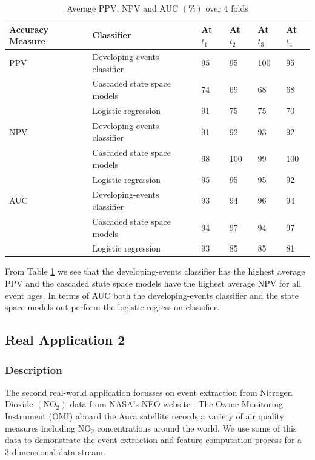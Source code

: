 \documentclass[11pt]{article}
\begin{document}
	\begin{table}[H]
		\centering
		\caption{Average PPV, NPV and AUC $(\%)$ over $4$ folds }
		\footnotesize
		\begin{tabular}{p{1.5cm}p{6cm}p{1cm}p{1cm}p{1cm}p{1cm}}
			\toprule
			Accuracy Measure & Classifier & At $t_1$ & At $t_2$  & At $t_3$ & At $t_4$    \\
			\midrule
			PPV & 	Developing-events classifier    & 95 	& 95  & 100 & 95        \\
			& Cascaded state space models    &74 	& 69  & 68 & 68        \\
			& Logistic regression & 91 & 75 & 75 & 70  	\\
			\hline	
			NPV & 	Developing-events classifier    & 91 	& 92  & 93 & 92        \\
			& Cascaded state space models    & 98 	& 100  & 99 & 100        \\
			& Logistic regression & 95 & 95 & 95 & 92  	\\
			\hline	  	
			AUC & 	Developing-events classifier    & 93 	& 94  & 96 & 94        \\
			& Cascaded state space models    & 94 	& 97  & 94 & 97        \\
			& Logistic regression & 93 & 85 & 85 & 81  	\\
			\bottomrule
		\end{tabular}
		\label{tab:AverageAccuracyReal}
	\end{table}

	From Table \ref{tab:AverageAccuracyReal} we see that the developing-events classifier has the highest average PPV and the cascaded state space models have the highest average NPV for all event ages. In terms of AUC both the developing-events classifier and the state space models out perform the logistic regression classifier.
	
	
	\subsection{Real Application 2}
	\subsubsection{Description}
	The second real-world application focusses on event extraction from Nitrogen Dioxide $(\text{NO}_2)$ data from NASA's NEO website \cite{OMINO2}. The Ozone Monitoring Instrument (OMI) \cite{levelt2006ozone} aboard the Aura satellite records a variety of air quality measures including $\text{NO}_2$ concentrations around the world. We use some of this data to demonstrate the event extraction and feature computation process for a 3-dimensional data stream.
	
\end{document}
